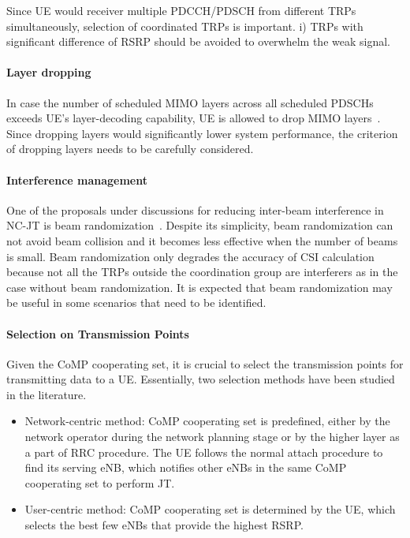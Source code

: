 \documentclass[a4paper,12pt]{article}%
\begin{document}
{Since UE would receiver multiple PDCCH/PDSCH from different TRPs simultaneously, selection of coordinated TRPs is important. i) TRPs with significant difference of RSRP should be avoided to overwhelm the weak signal.

\paragraph{Layer dropping}

In case the number of scheduled MIMO layers across all scheduled PDSCHs exceeds UE's layer-decoding capability, UE is allowed to drop MIMO layers~\cite{R1-1710523}. Since dropping layers would significantly lower system performance, the criterion of dropping layers needs to be carefully considered.

 \paragraph{Interference management}

One of the proposals under discussions for reducing inter-beam interference in NC-JT is beam randomization~\cite{R1-1710180}. Despite its simplicity, beam randomization can not avoid beam collision and it becomes less effective when the number of beams is small. Beam randomization only degrades the accuracy of CSI calculation because not all the TRPs outside the coordination group are interferers as in the case without beam randomization. It is expected that beam randomization may be useful in some scenarios that need to be identified.

\paragraph{Selection on Transmission Points}

Given the CoMP cooperating set, it is crucial to select the transmission points for transmitting data to a UE. Essentially, two selection methods have been studied in the literature.
\begin{itemize}
\item Network-centric method: CoMP cooperating set is predefined, either by the network operator during the network planning stage or by the higher layer as a part of RRC procedure. The UE follows the normal attach procedure to find its serving eNB, which notifies other eNBs in the same CoMP cooperating set to perform JT.
\item User-centric method: CoMP cooperating set is determined by the UE, which selects the best few eNBs that provide the highest RSRP.
\end{itemize}

}
\end{document}
